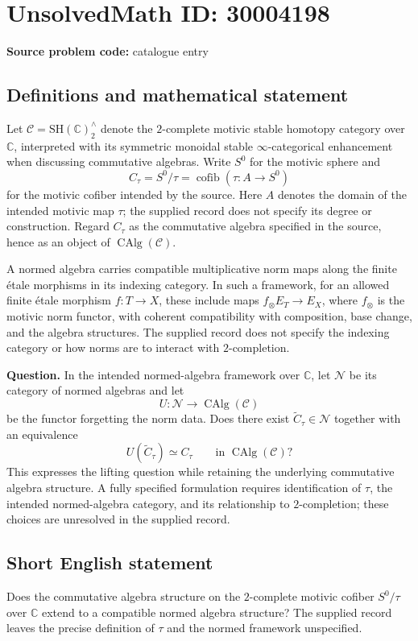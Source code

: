 \documentclass[11pt]{article}
\newcommand{\C}{\mathbb{C}}
\begin{document}
\section*{UnsolvedMath ID: 30004198}
\textbf{Source problem code:} catalogue entry
\subsection{Definitions and mathematical statement}
Let \(\mathcal C=\mathrm{SH}(\C)^{\wedge}_2\) denote the \(2\)-complete motivic stable homotopy category over \(\C\), interpreted with its symmetric monoidal stable \(\infty\)-categorical enhancement when discussing commutative algebras. Write \(S^0\) for the motivic sphere and
\[
C_\tau=S^0/\tau=\operatorname{cofib}(\tau\colon A\longrightarrow S^0)
\]
for the motivic cofiber intended by the source. Here \(A\) denotes the domain of the intended motivic map \(\tau\); the supplied record does not specify its degree or construction. Regard \(C_\tau\) as the commutative algebra specified in the source, hence as an object of \(\operatorname{CAlg}(\mathcal C)\).

A normed algebra carries compatible multiplicative norm maps along the finite \'{e}tale morphisms in its indexing category. In such a framework, for an allowed finite \'{e}tale morphism \(f\colon T\to X\), these include maps \(f_\otimes E_T\to E_X\), where \(f_\otimes\) is the motivic norm functor, with coherent compatibility with composition, base change, and the algebra structures. The supplied record does not specify the indexing category or how norms are to interact with \(2\)-completion.

\textbf{Question.} In the intended normed-algebra framework over \(\C\), let \(\mathcal N\) be its category of normed algebras and let
\[
U\colon\mathcal N\longrightarrow\operatorname{CAlg}(\mathcal C)
\]
be the functor forgetting the norm data. Does there exist \(\widetilde C_\tau\in\mathcal N\) together with an equivalence
\[
U(\widetilde C_\tau)\simeq C_\tau
\qquad\text{in }\operatorname{CAlg}(\mathcal C)?
\]
This expresses the lifting question while retaining the underlying commutative algebra structure. A fully specified formulation requires identification of \(\tau\), the intended normed-algebra category, and its relationship to \(2\)-completion; these choices are unresolved in the supplied record.
\subsection{Short English statement}
Does the commutative algebra structure on the \(2\)-complete motivic cofiber \(S^0/\tau\) over \(\C\) extend to a compatible normed algebra structure? The supplied record leaves the precise definition of \(\tau\) and the normed framework unspecified.
\end{document}
